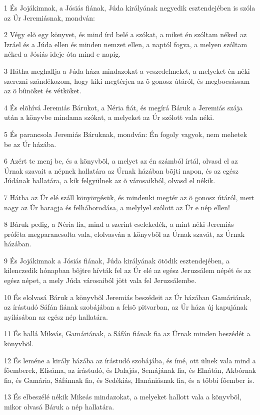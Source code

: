 \par 1 És Jojákimnak, a Jósiás fiának, Júda királyának negyedik esztendejében is szóla az Úr Jeremiásnak, mondván:
\par 2 Végy elõ egy könyvet, és mind írd belé a szókat, a miket én szóltam néked az Izráel és a Júda ellen és minden nemzet ellen, a naptól fogva, a melyen szóltam néked a Jósiás ideje óta mind e napig.
\par 3 Hátha meghallja a Júda háza mindazokat a veszedelmeket, a melyeket én néki szerezni szándékozom, hogy kiki megtérjen az õ gonosz útáról, és megbocsássam az õ bûnöket és vétköket.
\par 4 És elõhívá Jeremiás Bárukot, a Néria fiát, és megírá Báruk a Jeremiás szája után a könyvbe mindama szókat, a melyeket az Úr szólott vala néki.
\par 5 És parancsola Jeremiás Báruknak, mondván: Én fogoly vagyok, nem mehetek be az Úr házába.
\par 6 Azért te menj be, és a könyvbõl, a melyet az én számból írtál, olvasd el az Úrnak szavait a népnek hallatára az Úrnak házában bõjti napon, és az egész Júdának hallatára, a kik felgyülnek az õ városaikból, olvasd el nékik.
\par 7 Hátha az Úr elé száll könyörgésük, és mindenki megtér az õ gonosz útáról, mert nagy az Úr haragja és felháborodása, a melylyel szólott az Úr e nép ellen!
\par 8 Báruk pedig, a Néria fia, mind a szerint cselekedék, a mint néki Jeremiás próféta megparancsolta vala, elolvasván a könyvbõl az Úrnak szavát, az Úrnak házában.
\par 9 És Jojákimnak a Jósiás fiának, Júda királyának ötödik esztendejében, a kilenczedik hónapban bõjtre hívták fel az Úr elé az egész Jeruzsálem népét és az egész népet, a mely Júda városaiból jött vala fel Jeruzsálembe.
\par 10 És elolvasá Báruk a könyvbõl Jeremiás beszédeit az Úr házában Gamáriának, az írástudó Sáfán fiának szobájában a felsõ pitvarban, az Úr háza új kapujának nyílásában az egész nép hallatára.
\par 11 És hallá Mikeás, Gamáriának, a Sáfán fiának fia az Úrnak minden beszédét a könyvbõl.
\par 12 És leméne a király házába az írástudó szobájába, és ímé, ott ülnek vala mind a fõemberek, Elisáma, az írástudó, és Dalajás, Semájának fia, és Elnátán, Akbórnak fia, és Gamária, Sáfánnak fia, és Sedékiás, Hanániásnak fia, és a többi fõember is.
\par 13 És elbeszélé nékik Mikeás mindazokat, a melyeket hallott vala a könyvbõl, mikor olvasá Báruk a nép hallatára.

